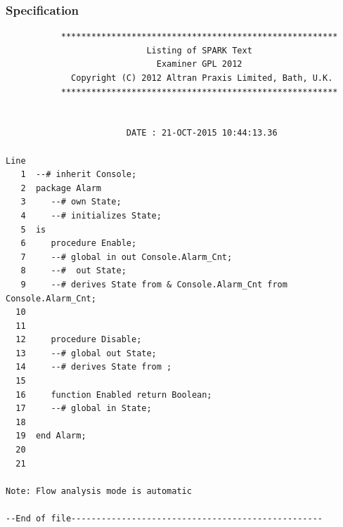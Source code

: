 \documentclass[a4paper, titlepage]{article}
\begin{document}
\subsubsection{Specification}
{\tiny
\begin{lstlisting}
           *******************************************************
                            Listing of SPARK Text
                              Examiner GPL 2012
             Copyright (C) 2012 Altran Praxis Limited, Bath, U.K.
           *******************************************************


                        DATE : 21-OCT-2015 10:44:13.36

Line
   1  --# inherit Console;
   2  package Alarm
   3     --# own State;
   4     --# initializes State;
   5  is
   6     procedure Enable;
   7     --# global in out Console.Alarm_Cnt;
   8     --#  out State;
   9     --# derives State from & Console.Alarm_Cnt from Console.Alarm_Cnt;
  10  
  11  
  12     procedure Disable;
  13     --# global out State;
  14     --# derives State from ;
  15  
  16     function Enabled return Boolean;
  17     --# global in State;
  18  
  19  end Alarm;
  20  
  21  

Note: Flow analysis mode is automatic

--End of file--------------------------------------------------
\end{lstlisting}
}
\end{document}
